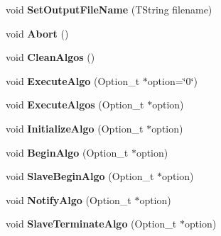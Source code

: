 \begin{DoxyCompactItemize}
\item 
\hypertarget{class_h_a_l_1_1_algorithm_ae30243bd1c0691a003d33ba6b02518cc}{void {\bfseries Set\-Output\-File\-Name} (T\-String filename)}\label{class_h_a_l_1_1_algorithm_ae30243bd1c0691a003d33ba6b02518cc}

\item 
\hypertarget{class_h_a_l_1_1_algorithm_a0b2b7e0a90824e7c2ed31fd8fc299d61}{void {\bfseries Abort} ()}\label{class_h_a_l_1_1_algorithm_a0b2b7e0a90824e7c2ed31fd8fc299d61}

\item 
\hypertarget{class_h_a_l_1_1_algorithm_a77516eeeffb62ed507616ddd006e023c}{void {\bfseries Clean\-Algos} ()}\label{class_h_a_l_1_1_algorithm_a77516eeeffb62ed507616ddd006e023c}

\item 
\hypertarget{class_h_a_l_1_1_algorithm_a64a01d69f068ef29f19057d9f4c1b172}{void {\bfseries Execute\-Algo} (Option\-\_\-t $\ast$option=\char`\"{}0\char`\"{})}\label{class_h_a_l_1_1_algorithm_a64a01d69f068ef29f19057d9f4c1b172}

\item 
\hypertarget{class_h_a_l_1_1_algorithm_aaf9d9ecdf99c327ec4de93cd5930d3c4}{void {\bfseries Execute\-Algos} (Option\-\_\-t $\ast$option)}\label{class_h_a_l_1_1_algorithm_aaf9d9ecdf99c327ec4de93cd5930d3c4}

\item 
\hypertarget{class_h_a_l_1_1_algorithm_aeb9b42850a64b3c25e7035e04c68a508}{void {\bfseries Initialize\-Algo} (Option\-\_\-t $\ast$option)}\label{class_h_a_l_1_1_algorithm_aeb9b42850a64b3c25e7035e04c68a508}

\item 
\hypertarget{class_h_a_l_1_1_algorithm_af988397097b2a83fae058744d3a909a6}{void {\bfseries Begin\-Algo} (Option\-\_\-t $\ast$option)}\label{class_h_a_l_1_1_algorithm_af988397097b2a83fae058744d3a909a6}

\item 
\hypertarget{class_h_a_l_1_1_algorithm_a82cc758128d3745ba8c91f38c4aa4d15}{void {\bfseries Slave\-Begin\-Algo} (Option\-\_\-t $\ast$option)}\label{class_h_a_l_1_1_algorithm_a82cc758128d3745ba8c91f38c4aa4d15}

\item 
\hypertarget{class_h_a_l_1_1_algorithm_a205e6c98e7b7dfca647edadaa1d159e8}{void {\bfseries Notify\-Algo} (Option\-\_\-t $\ast$option)}\label{class_h_a_l_1_1_algorithm_a205e6c98e7b7dfca647edadaa1d159e8}

\item 
\hypertarget{class_h_a_l_1_1_algorithm_ae9b629cebefe6ac8629dd6a2e66d05d6}{void {\bfseries Slave\-Terminate\-Algo} (Option\-\_\-t $\ast$option)}\label{class_h_a_l_1_1_algorithm_ae9b629cebefe6ac8629dd6a2e66d05d6}


\end{DoxyCompactItemize}
